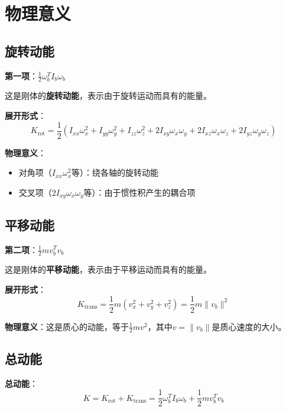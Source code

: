 \documentclass[12pt,a4paper]{article}
\begin{document}
\section{物理意义}

\subsection{旋转动能}

\textbf{第一项}：$\frac{1}{2}\omega_b^T I_b \omega_b$

这是刚体的\textbf{旋转动能}，表示由于旋转运动而具有的能量。

\textbf{展开形式}：
\begin{equation}
K_{\text{rot}} = \frac{1}{2}(I_{xx}\omega_x^2 + I_{yy}\omega_y^2 + I_{zz}\omega_z^2 + 2I_{xy}\omega_x\omega_y + 2I_{xz}\omega_x\omega_z + 2I_{yz}\omega_y\omega_z)
\end{equation}

\textbf{物理意义}：
\begin{itemize}
\item 对角项（$I_{xx}\omega_x^2$等）：绕各轴的旋转动能
\item 交叉项（$2I_{xy}\omega_x\omega_y$等）：由于惯性积产生的耦合项
\end{itemize}

\subsection{平移动能}

\textbf{第二项}：$\frac{1}{2}mv_b^T v_b$

这是刚体的\textbf{平移动能}，表示由于平移运动而具有的能量。

\textbf{展开形式}：
\begin{equation}
K_{\text{trans}} = \frac{1}{2}m(v_x^2 + v_y^2 + v_z^2) = \frac{1}{2}m\|v_b\|^2
\end{equation}

\textbf{物理意义}：这是质心的动能，等于$\frac{1}{2}mv^2$，其中$v = \|v_b\|$是质心速度的大小。

\subsection{总动能}

\textbf{总动能}：
\begin{equation}
K = K_{\text{rot}} + K_{\text{trans}} = \frac{1}{2}\omega_b^T I_b \omega_b + \frac{1}{2}mv_b^T v_b
\end{equation}
\end{document}
